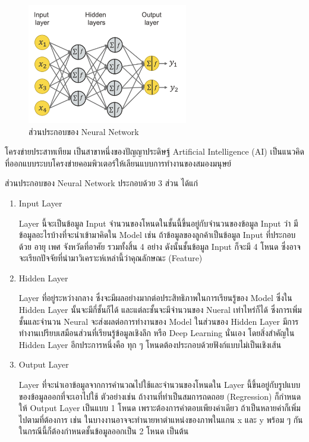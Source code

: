 \documentclass[12pt,oneside,openright,a4paper]{cpe-thai-project}
\begin{document}
    \begin{figure}[!ht]\centering
      \includegraphics[width=7cm]{./img/nn.png}
      \caption{ส่วนประกอบของ Neural Network}\label{fig:nn}
    \end{figure}
    \hspace{1cm}โครงข่ายประสาทเทียม เป็นสาขาหนึ่งของปัญญาประดิษฐ์ Artificial Intelligence (AI) 
    เป็นแนวคิดที่ออกแบบระบบโครงข่ายคอมพิวเตอร์ให้เลียนแบบการทำงานของสมองมนุษย์ \cite{data_sci}

    ส่วนประกอบของ Neural Network ประกอบด้วย 3 ส่วน ได้แก่
    \begin{enumerate}
      \item Input Layer 
            
            \hspace{1cm}Layer นี้จะเป็นข้อมูล Input จำนวนของโหนดในชั้นนี้ขึ้นอยู่กับจำนวนของข้อมูล Input ว่า มีข้อมูลอะไรบ้างที่จะนำเข้ามาคิดใน Model เช่น ถ้าข้อมูลของลูกค้าเป็นข้อมูล Input ที่ประกอบด้วย 
            อายุ เพศ จังหวัดที่อาศัย รวมทั้งสิ้น 4 อย่าง ดังนั้นชั้นข้อมูล Input ก็จะมี 4 โหนด ซึ่งอาจจะเรียกปัจจัยที่นำมาวิเคราะห์เหล่านี้ว่าคุณลักษณะ (Feature)
      \item Hidden Layer 
            
            \hspace{1cm}Layer ที่อยู่ระหว่างกลาง ซึ่งจะมีผลอย่างมากต่อประสิทธิภาพในการเรียนรู้ของ Model ซึ่งใน Hidden Layer นั้นจะมีกี่ชั้นก็ได้ 
            และแต่ละชั้นจะมีจำนวนของ Nueral เท่าไหร่ก็ได้ ซึ่งการเพิ่มชั้นและจำนวน Neural จะส่งผลต่อการทำงานของ Model 
            ในส่วนของ Hidden Layer มีการทำงานเปรียบเสมือนส่วนที่เรียนรู้ข้อมูลเชิงลึก หรือ Deep Learning นั่นเอง โดยสิ่งสำคัญใน Hidden Layer อีกประการหนึ่งคือ 
            ทุก ๆ โหนดต้องประกอบด้วยฟังก์แบบไม่เป็นเชิงเส้น
      \item Output Layer 
            
            \hspace{1cm}Layer ที่จะนำเอาข้อมูลจากการคำนวณไปใช้และจำนวนของโหนดใน Layer นี้ขึ้นอยู่กับรูปแบบของข้อมูลออกที่จะเอาไปใช้ 
            ตัวอย่างเช่น ถ้างานที่ทำเป็นสมการถดถอย (Regression) ก็กำหนดให้ Output Layer เป็นแบบ 1 โหนด เพราะต้องการคำตอบเพียงค่าเดียว 
            ถ้าเป็นหลายค่าก็เพิ่มไปตามที่ต้องการ เช่น ในบางงานอาจจะทำนายหาตำแหน่งของภาพในแกน x และ y พร้อม ๆ กัน 
            ในกรณีนี้ก็ต้องกำหนดชั้นข้อมูลออกเป็น 2 โหนด เป็นต้น
    \end{enumerate}
\end{document}
